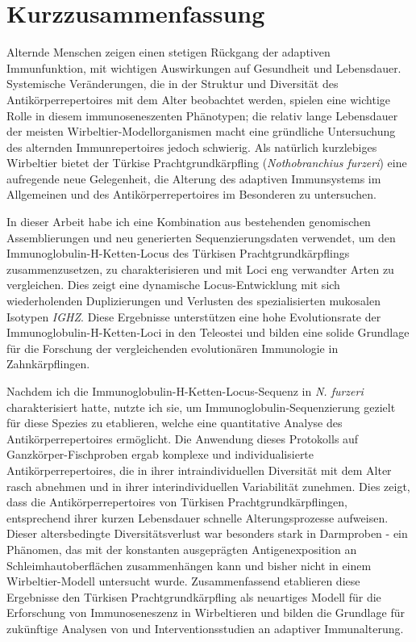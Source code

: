 {
\cleardoublepage
\setsinglecolumn
\chapter*{\centering \LARGE Kurzzusammenfassung}
\thispagestyle{empty}
Alternde Menschen zeigen einen stetigen R\"uckgang der adaptiven Immunfunktion, mit wichtigen Auswirkungen auf Gesundheit und Lebensdauer. Systemische Ver\"anderungen, die in der Struktur und Diversit\"at des Antik\"orperrepertoires mit dem Alter beobachtet werden, spielen eine wichtige Rolle in diesem immunoseneszenten Ph\"anotypen; die relativ lange Lebensdauer der meisten Wirbeltier-Modellorganismen macht eine gr\"undliche Untersuchung des alternden Immunrepertoires jedoch schwierig. Als nat\"urlich kurzlebiges Wirbeltier bietet der T\"urkise Prachtgrundk\"arpfling (\textit{Nothobranchius furzeri}) eine aufregende neue Gelegenheit, die Alterung des adaptiven Immunsystems im Allgemeinen und des Antik\"orperrepertoires im Besonderen zu untersuchen.

In dieser Arbeit habe ich eine Kombination aus bestehenden genomischen Assemblierungen und neu generierten Sequenzierungsdaten verwendet, um den Immunoglobulin-H-Ketten-Locus des T\"urkisen Prachtgrundk\"arpflings zusammenzusetzen, zu charakterisieren und mit Loci eng verwandter Arten zu vergleichen. Dies zeigt eine dynamische Locus-Entwicklung mit sich wiederholenden Duplizierungen und Verlusten des spezialisierten mukosalen Isotypen \textit{IGHZ}. Diese Ergebnisse unterst\"utzen eine hohe Evolutionsrate der Immunoglobulin-H-Ketten-Loci in den Teleostei und bilden eine solide Grundlage f\"ur die Forschung der vergleichenden evolution\"aren Immunologie in Zahnk\"arpflingen.

Nachdem ich die Immunoglobulin-H-Ketten-Locus-Sequenz in \textit{N. furzeri} charakterisiert hatte, nutzte ich sie, um Immunoglobulin-Sequenzierung gezielt f\"ur diese Spezies zu etablieren, welche eine quantitative Analyse des Antik\"orperrepertoires erm\"oglicht. Die Anwendung dieses Protokolls auf Ganzk\"orper-Fischproben ergab komplexe und individualisierte Antik\"orperrepertoires, die in ihrer intraindividuellen Diversit\"at mit dem Alter rasch abnehmen und in ihrer interindividuellen Variabilit\"at zunehmen. Dies zeigt, dass die Antik\"orperrepertoires von T\"urkisen Prachtgrundk\"arpflingen, entsprechend ihrer kurzen Lebensdauer schnelle Alterungsprozesse aufweisen. Dieser altersbedingte Diversit\"atsverlust war besonders stark in Darmproben - ein Ph\"anomen, das mit der konstanten ausgepr\"agten Antigenexposition an Schleimhautoberfl\"achen zusammenh\"angen kann und bisher nicht in einem Wirbeltier-Modell untersucht wurde. Zusammenfassend etablieren diese Ergebnisse den T\"urkisen Prachtgrundk\"arpfling als neuartiges Modell f\"ur die Erforschung von Immunoseneszenz in Wirbeltieren und bilden die Grundlage f\"ur zuk\"unftige Analysen von und Interventionsstudien an adaptiver Immunalterung.
}
